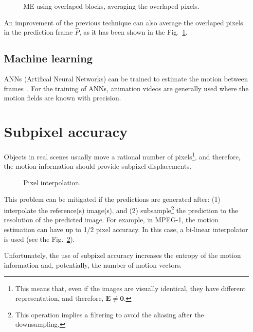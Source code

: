 \begin{figure}
  \centering
  \caption{ME using overlaped blocks, averaging the overlaped pixels.}
  \label{fig:average}
\end{figure}

An improvement of the previous technique can also average the
overlaped pixels in the prediction frame $\hat{P}$, as it has been
shown in the Fig.~\ref{fig:average}.


\subsection{Machine learning}

ANNs (Artifical Neural Networks) can be trained to estimate the motion
between frames~\cite{dosovitskiy2015flownet}. For the training of
ANNs, animation videos are generally used where the motion fields are
known with precision.


\section{Subpixel accuracy}

Objects in real scenes usually move a rational number of
pixels\footnote{This means that, even if the images are visually
  identical, they have different representation, and therefore,
  ${\mathbf E}\ne{\mathbf 0}$.}, and therefore, the motion information
should provide subpixel displacements.

\begin{figure}
  \caption{Pixel interpolation.}
  \label{fig:interpolation}
\end{figure}

This problem can be mitigated if the predictions are generated after:
(1) interpolate the reference(s) image(s), and (2)
subsample\footnote{This operation implies a filtering to avoid the
  aliasing after the downsampling.} the prediction to the resolution
of the predicted image. For example, in MPEG-1, the motion estimation
can have up to 1/2 pixel accuracy. In this case, a bi-linear
interpolator is used (see the Fig.~\ref{fig:interpolation}).

Unfortunately, the use of subpixel accuracy increases
the entropy of the motion information and, potentially, the number of
motion vectors.


